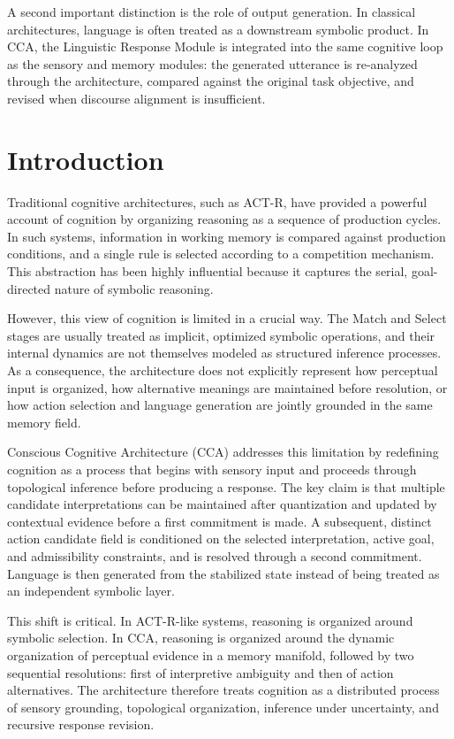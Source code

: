 \documentclass[10pt,journal,compsoc]{IEEEtran}
\begin{document}
A second important distinction is the role of output generation. In classical architectures, language is often treated as a downstream symbolic product. In CCA, the Linguistic Response Module is integrated into the same cognitive loop as the sensory and memory modules: the generated utterance is re-analyzed through the architecture, compared against the original task objective, and revised when discourse alignment is insufficient.

\section{Introduction}

Traditional cognitive architectures, such as ACT-R, have provided a powerful account of cognition by organizing reasoning as a sequence of production cycles. In such systems, information in working memory is compared against production conditions, and a single rule is selected according to a competition mechanism. This abstraction has been highly influential because it captures the serial, goal-directed nature of symbolic reasoning.

However, this view of cognition is limited in a crucial way. The Match and Select stages are usually treated as implicit, optimized symbolic operations, and their internal dynamics are not themselves modeled as structured inference processes. As a consequence, the architecture does not explicitly represent how perceptual input is organized, how alternative meanings are maintained before resolution, or how action selection and language generation are jointly grounded in the same memory field.

Conscious Cognitive Architecture (CCA) addresses this limitation by redefining cognition as a process that begins with sensory input and proceeds through topological inference before producing a response. The key claim is that multiple candidate interpretations can be maintained after quantization and updated by contextual evidence before a first commitment is made. A subsequent, distinct action candidate field is conditioned on the selected interpretation, active goal, and admissibility constraints, and is resolved through a second commitment. Language is then generated from the stabilized state instead of being treated as an independent symbolic layer.

This shift is critical. In ACT-R-like systems, reasoning is organized around symbolic selection. In CCA, reasoning is organized around the dynamic organization of perceptual evidence in a memory manifold, followed by two sequential resolutions: first of interpretive ambiguity and then of action alternatives. The architecture therefore treats cognition as a distributed process of sensory grounding, topological organization, inference under uncertainty, and recursive response revision.
\end{document}
